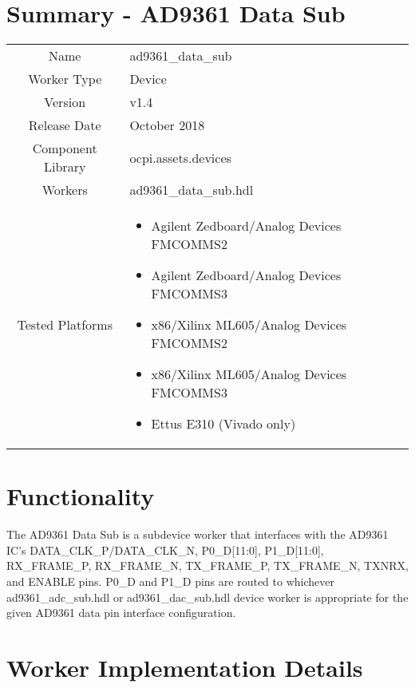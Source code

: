 \documentclass{article}
\author{} %
\date{Version \docVersion} %
\title{\docTitle}
\def\docVersion{1.4}
\def\comp{ad9361\_data\_sub}
\def\Comp{AD9361 Data Sub}
\begin{document}
\section*{Summary - \Comp}
\begin{tabular}{|c|M{13.5cm}|}
	\hline
	                  &                  \\
	\hline
	Name              & \comp            \\
	\hline
	Worker Type       & Device           \\
	\hline
	Version           & v\docVersion     \\
	\hline
	Release Date      & October 2018         \\
	\hline
	Component Library & ocpi.assets.devices     \\
	\hline
	Workers           & \comp.hdl        \\
	\hline
	Tested Platforms  &
\begin{itemize}
  \item Agilent Zedboard/Analog Devices FMCOMMS2
  \item Agilent Zedboard/Analog Devices FMCOMMS3
  \item x86/Xilinx ML605/Analog Devices FMCOMMS2
  \item x86/Xilinx ML605/Analog Devices FMCOMMS3
  \item Ettus E310 (Vivado only)
\end{itemize} \\
	\hline
\end{tabular}

\section*{Functionality}
	The \Comp{} is a subdevice worker that interfaces with the AD9361 IC\cite{ad9361}'s DATA\_CLK\_P/DATA\_CLK\_N, P0\_D[11:0], P1\_D[11:0], RX\_FRAME\_P, RX\_FRAME\_N, TX\_FRAME\_P, TX\_FRAME\_N, TXNRX, and ENABLE pins. P0\_D and P1\_D pins are routed to whichever ad9361\_adc\_sub.hdl or ad9361\_dac\_sub.hdl device worker is appropriate for the given AD9361 data pin interface configuration.

\section*{Worker Implementation Details}
\end{document}
